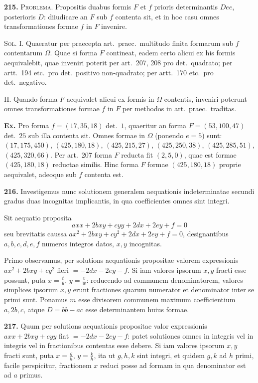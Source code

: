 \documentclass[12pt,a4paper]{article}
\theoremstyle{plain}
\theoremstyle{definition}
\theoremstyle{remark}
\begin{document}
\textbf{215.} \textsc{Problema.} Propositis duabus formis $F$ et $f$ prioris determinantis $Dee$, posterioris $D$: diiudicare an $F$ sub $f$ contenta sit, et in hoc casu omnes transformationes formae $f$ in $F$ invenire.

\textsc{Sol.} I. Quaeratur per praecepta art.\ praec.\ multitudo finita formarum sub $f$ contentarum $\Omega$. Quae si forma $F$ contineat, eadem certo alicui ex his formis aequivalebit, quae inveniri poterit per art.~207, 208 pro det.\ quadrato; per artt.~194 etc.\ pro det.\ positivo non-quadrato; per artt.~170 etc.\ pro det.\ negativo.

II. Quando forma $F$ aequivalet alicui ex formis in $\Omega$ contentis, inveniri poterunt omnes transformationes formae $f$ in $F$ per methodos in art.\ praec.\ traditas.

\textbf{Ex.} Pro forma $f=(17,35,18)$ det.\ $1$, quaeritur an forma $F=(53,100,47)$ det.\ $25$ sub illa contenta sit. Omnes formae in $\Omega$ (ponendo $e=5$) sunt: $(17,175,450)$, $(425,180,18)$, $(425,215,27)$, $(425,250,38)$, $(425,285,51)$, $(425,320,66)$. Per art.~207 forma $F$ reducta fit $(2,5,0)$, quae est formae $(425,180,18)$ reductae similis. Hinc forma $F$ formae $(425,180,18)$ proprie aequivalet, adeoque sub $f$ contenta est.

\textbf{216.}
Investigemus nunc solutionem generalem aequationis indeterminatae secundi gradus duas incognitas implicantis, in qua coefficientes omnes sint integri.

Sit aequatio proposita
\[
axx+2bxy+cyy+2dx+2ey+f=0
\]
seu brevitatis caussa $ax^2+2bxy+cy^2+2dx+2ey+f=0$, designantibus $a,b,c,d,e,f$ numeros integros datos, $x,y$ incognitas.

Primo observamus, per solutions aequationis propositae valorem expressionis $ax^2+2bxy+cy^2$ fieri $=-2dx-2ey-f$. Si iam valores ipsorum $x,y$ fracti esse possunt, puta $x=\frac{t}{u}$, $y=\frac{v}{w}$: reducendo ad communem denominatorem, valores simplices ipsorum $x,y$ erunt fractiones quarum numerator et denominator inter se primi sunt. Ponamus $m$ esse divisorem communem maximum coefficientium $a,2b,c$, atque $D=bb-ac$ esse determinantem huius formae.

\textbf{217.} Quum per solutions aequationis propositae valor expressionis $axx+2bxy+cyy$ fiat $=-2dx-2ey-f$: patet solutiones omnes in integris vel in integris vel in fractionibus contentas esse debere. Si iam valores ipsorum $x,y$ fracti sunt, puta $x=\frac{g}{h}$, $y=\frac{k}{h}$, ita ut $g,h,k$ sint integri, et quidem $g,k$ ad $h$ primi, facile perspicitur, fractionem $x$ reduci posse ad formam in qua denominator est ad $a$ primus.
\end{document}
